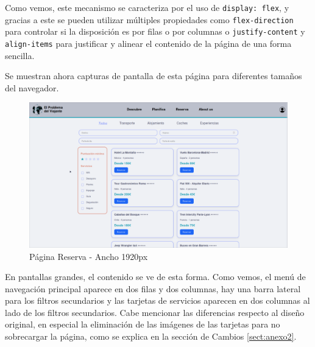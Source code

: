 \documentclass[11pt, a4paper]{book}
\begin{document}
    Como vemos, este mecanismo se caracteriza por el uso de \texttt{display: flex}, y gracias a este se pueden utilizar múltiples propiedades como \texttt{flex-direction} para controlar si la disposición es por filas o por columnas o \texttt{justify-content} y \texttt{align-items} para justificar y alinear el contenido de la página de una forma sencilla.

    Se muestran ahora capturas de pantalla de esta página para diferentes tamaños del navegador.

	\begin{figure} [H]
		\centering
		\includegraphics[width=\textwidth]{CSS/5-1 1920.png}
		\caption{Página Reserva - Ancho 1920px}
	\end{figure}

    En pantallas grandes, el contenido se ve de esta forma. Como vemos, el menú de navegación principal aparece en dos filas y dos columnas, hay una barra lateral para los filtros secundarios y las tarjetas de servicios aparecen en dos columnas al lado de los filtros secundarios. Cabe mencionar las diferencias respecto al diseño original, en especial la eliminación de las imágenes de las tarjetas para no sobrecargar la página, como se explica en la sección de Cambios \ref{sect:anexo2}.
\end{document}
